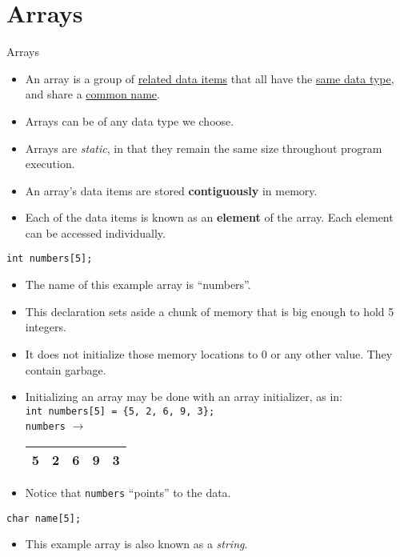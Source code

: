 \documentclass[graphics]{beamer}
\begin{document}
\section{Arrays}
\begin{frame}{Arrays}
     {
        \begin{itemize}
            \item An array is a group of \underline{related data items} that all have the \underline{same data type}, and share a \underline{common name}.
            \item Arrays can be of any data type we choose.
            \item Arrays are \textit{static}, in that they remain the same size throughout program execution.
            \item An array's data items are stored \textbf{contiguously} in memory.
            \item Each of the data items is known as an \textbf{element} of the array. Each element can be accessed individually.
        \end{itemize}
    }
     {
        \texttt{int numbers[5];}
        \begin{itemize}
            \item The name of this example array is ``numbers''.
            \item This declaration sets aside a chunk of memory that is big enough to hold 5 integers.
            \item It does not initialize those memory locations to 0 or any other value.  They contain garbage.
            \item Initializing an array may be done with an array initializer, as in: \\ \texttt{int numbers[5] = \{5, 2, 6, 9, 3\};} \\
            \texttt{numbers} $\rightarrow$
            \begin{tabular}{|c|c|c|c|c|}
                \hline
                5 & 2 & 6 & 9 & 3 \\
                \hline
            \end{tabular}
            \item Notice that \texttt{numbers} ``points'' to the data.
        \end{itemize}
    }
     {
        \texttt{char name[5];}
        \begin{itemize}
            \item This example array is also known as a \textit{string}.

\end{itemize}}
\end{frame}
\end{document}
